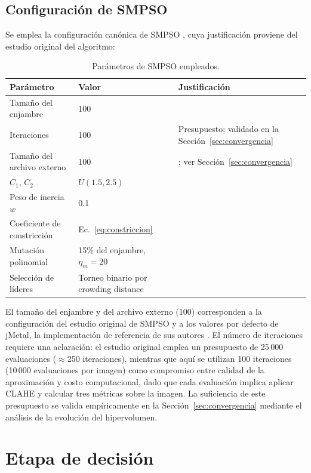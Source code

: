 \subsection{Configuración de SMPSO}

Se emplea la configuración canónica de SMPSO \citep{Nebro2009}, cuya justificación proviene del estudio original del algoritmo:

\begin{table}[H]
\centering
\caption{Parámetros de SMPSO empleados.}
\label{tab:config_smpso}
\begin{tabular}{lll}
\hline
\textbf{Parámetro} & \textbf{Valor} & \textbf{Justificación} \\
\hline
Tamaño del enjambre & 100 & \citep{Nebro2009} \\
Iteraciones & 100 & Presupuesto; validado en la Sección~\ref{sec:convergencia} \\
Tamaño del archivo externo & 100 & \citep{Nebro2009}; ver Sección~\ref{sec:convergencia} \\
$C_1$, $C_2$ & $U(1.5, 2.5)$ & \citep{Nebro2009} \\
Peso de inercia $w$ & 0.1 & \citep{Nebro2009} \\
Coeficiente de constricción & Ec.~\ref{eq:constriccion} & \citep{Clerc2002} \\
Mutación polinomial & 15\% del enjambre, $\eta_m = 20$ & \citep{Nebro2009} \\
Selección de líderes & Torneo binario por crowding distance & \citep{Deb2002} \\
\hline
\end{tabular}
\end{table}

El tamaño del enjambre y del archivo externo (100) corresponden a la configuración del estudio original de SMPSO y a los valores por defecto de jMetal, la implementación de referencia de sus autores \citep{Nebro2009}. El número de iteraciones requiere una aclaración: el estudio original emplea un presupuesto de 25\,000 evaluaciones ($\approx$250 iteraciones), mientras que aquí se utilizan 100 iteraciones (10\,000 evaluaciones por imagen) como compromiso entre calidad de la aproximación y costo computacional, dado que cada evaluación implica aplicar CLAHE y calcular tres métricas sobre la imagen. La suficiencia de este presupuesto se valida empíricamente en la Sección~\ref{sec:convergencia} mediante el análisis de la evolución del hipervolumen.

\section{Etapa de decisión}

